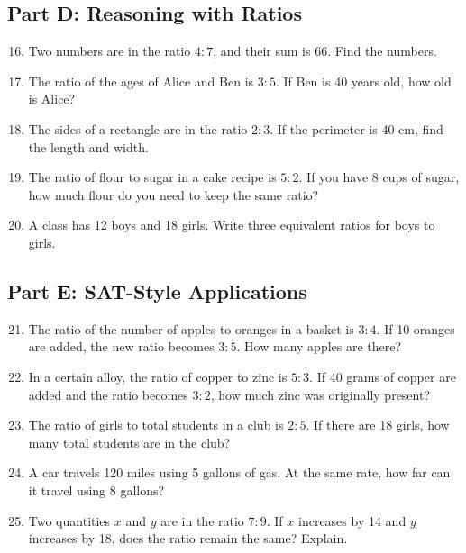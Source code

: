 \documentclass[12pt]{article}
\begin{document}
\subsection*{Part D: Reasoning with Ratios}
\begin{enumerate}
  \setcounter{enumi}{15}
  \item Two numbers are in the ratio \(4:7\), and their sum is 66. Find the numbers.
  \item The ratio of the ages of Alice and Ben is \(3:5\). If Ben is 40 years old, how old is Alice?
  \item The sides of a rectangle are in the ratio \(2:3\). If the perimeter is 40 cm, find the length and width.
  \item The ratio of flour to sugar in a cake recipe is \(5:2\). If you have 8 cups of sugar, how much flour do you need to keep the same ratio?
  \item A class has 12 boys and 18 girls. Write three equivalent ratios for boys to girls.
\end{enumerate}

\subsection*{Part E: SAT-Style Applications}
\begin{enumerate}
  \setcounter{enumi}{20}
  \item The ratio of the number of apples to oranges in a basket is \(3:4\). If 10 oranges are added, the new ratio becomes \(3:5\). How many apples are there?
  \item In a certain alloy, the ratio of copper to zinc is \(5:3\). If 40 grams of copper are added and the ratio becomes \(3:2\), how much zinc was originally present?
  \item The ratio of girls to total students in a club is \(2:5\). If there are 18 girls, how many total students are in the club?
  \item A car travels 120 miles using 5 gallons of gas. At the same rate, how far can it travel using 8 gallons?
  \item Two quantities \(x\) and \(y\) are in the ratio \(7:9\). If \(x\) increases by 14 and \(y\) increases by 18, does the ratio remain the same? Explain.
\end{enumerate}

\newpage
\end{document}
